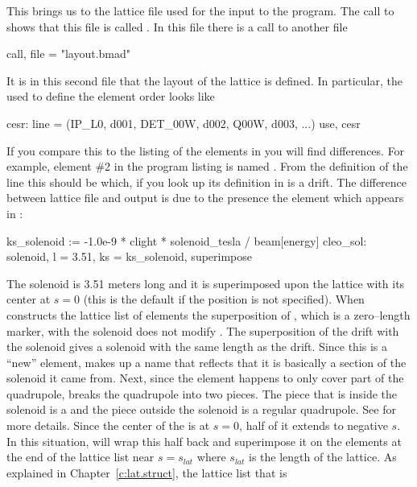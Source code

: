 {{{{{{{{{{{This brings us to the lattice file used for the input to the program.
The call to  shows that this file is called 
.
In this file there is a call to another file
  \begin{example}
  call, file = "layout.bmad"
  \end{example}
It is in this second file
that the layout of the lattice is defined. In particular, the  used
to define the element order looks like
\begin{example}
  cesr: line = (IP_L0, d001, DET_00W, d002, Q00W, d003, ...)
  use, cesr
\end{example}
If you compare this to the listing of the elements in  you will find differences. For
example, element \#2 in the program listing is named . From the definition of the
 line this should be  which, if you look up its definition in  is
a drift.  The difference between lattice file and output is due to the presence the 
element which appears in :
\begin{example}
  ks_solenoid    := -1.0e-9 * clight * solenoid_tesla / beam[energy]
  cleo_sol: solenoid, l = 3.51, ks = ks_solenoid, superimpose 
\end{example}
The solenoid is 3.51 meters long and it is superimposed upon the lattice with its center at $s = 0$
(this is the default if the position is not specified).  When  constructs the
lattice list of elements the superposition of , which is a zero--length marker, with the
solenoid does not modify . The superposition of the  drift with the solenoid
gives a solenoid with the same length as the drift. Since this is a ``new'' element,
 makes up a name that reflects that it is basically a section of the solenoid it
came from.  Next, since the  element happens to only cover part of the 
quadrupole,  breaks the quadrupole into two pieces. The piece that is inside the
solenoid is a  and the piece outside the solenoid is a regular quadrupole. See
 for more details. Since the center of the  is at $s = 0$, half of it
extends to negative $s$. In this situation,  will wrap this half back and
superimpose it on the elements at the end of the lattice list near $s = s_{lat}$ where $s_{lat}$ is
the length of the lattice.  As explained in Chapter~\ref{c:lat.struct}, the lattice list that is
}}}}}}}}}}}
